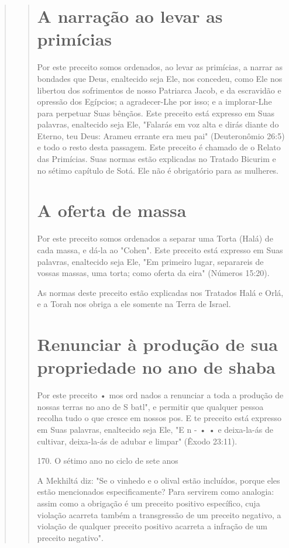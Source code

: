 \begin{quote}
\begin{quote}
\section{A narração ao levar as primícias}

Por este preceito somos ordenados, ao levar as primícias, a narrar as
bondades que Deus, enaltecido seja Ele, nos concedeu, como Ele nos
liber­tou dos sofrimentos de nosso Patriarca Jacob, e da escravidão e
opressão dos Egípcios; a agradecer-Lhe por isso; e a implorar-Lhe para
perpetuar Suas bên­çãos. Este preceito está expresso em Suas palavras,
enaltecido seja Ele, "Falarás em voz alta e dirás diante do Eterno, teu
Deus: Arameu errante era meu pai" (Deuteronômio 26:5) e todo o resto
desta passagem. Este preceito é chamado de o Relato das Primícias. Suas
normas estão explicadas no Tratado Bicurim e no sétimo capítulo de Sotá.
Ele não é obrigatório para as mulheres.

\section{A oferta de massa}

Por este preceito somos ordenados a separar uma Torta (Halá) de ca­da
massa, e dá-la ao "Cohen". Este preceito está expresso em Suas palavras,
enaltecido seja Ele, "Em primeiro lugar, separareis de vossas massas,
uma torta; como oferta da eira" (Números 15:20).

As normas deste preceito estão explicadas nos Tratados Halá e Orlá, e a
Torah nos obriga a ele somente na Terra de Israel.

\section{Renunciar à produção de sua propriedade no ano de shaba}

Por este preceito • mos ord nados a renunciar a toda a produção de
nossas terras no ano de S batl", e permitir que qualquer pessoa recolha
tudo o que cresce em nossos pos. E te preceito está expresso em Suas
pala­vras, enaltecido seja Ele, "E n - • • e deixa-la-ás de cultivar,
deixa-la-ás de adu­bar e limpar" (Êxodo 23:11).

170. O sétimo ano no ciclo de sete anos

A Mekhiltá diz: "Se o vinhedo e o olival estão incluídos, porque eles
estão mencionados especificamente? Para servirem como analogia: assim
co­mo a obrigação é um preceito positivo específico, cuja violação
acarreta tam­bém a transgressão de um preceito negativo, a violação de
qualquer preceito positivo acarreta a infração de um preceito negativo".


\end{quote}
\end{quote}
